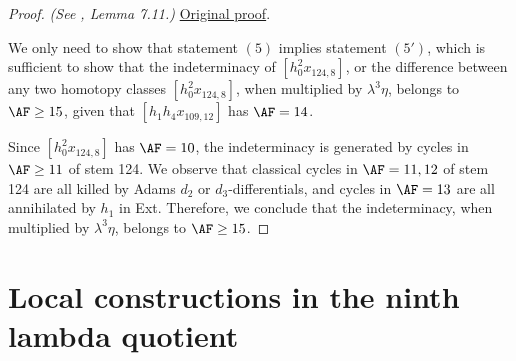\begin{proof}
\textit{(See \cite{LWX126}, Lemma 7.11.)} \href{paper/main.tex.html#L2254}{Original proof}.

We only need to show that statement $(5)$ implies statement $(5')$, which is sufficient to show that the indeterminacy of $[h_0^2x_{124,8}]$, or the difference between any two homotopy classes $[h_0^2x_{124,8}]$, when multiplied by $\lambda^3 \eta$, belongs to $\AF \ge 15$, given that $[h_1h_4x_{109,12}]$ has $\AF=14$.

    Since $[h_0^2x_{124,8}]$ has $\AF=10$, the indeterminacy is generated by cycles in $\AF \ge 11$ of stem 124. We observe that classical cycles in $\AF=11, 12$ of stem 124 are all killed by Adams $d_2$ or $d_3$-differentials, and cycles in $\AF=13$ are all annihilated by $h_1$ in Ext. Therefore, we conclude that the indeterminacy, when multiplied by $\lambda^3 \eta$, belongs to $\AF \ge 15$.
\end{proof}

\section{Local constructions in the ninth lambda quotient}

